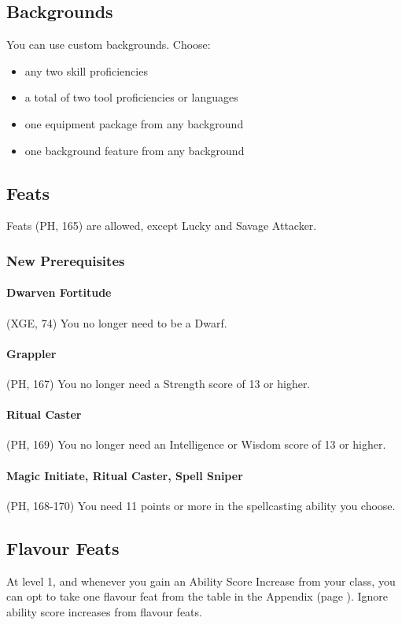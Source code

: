 \documentclass[letterpaper,twocolumn,openany,nodeprecatedcode,bg=print]{dndbook}
\newcommand{\pg}[1]{page \pageref{#1}}
\begin{document}
\subsection{Backgrounds}
You can use custom backgrounds. Choose:
\begin{itemize}
\item any two skill proficiencies 
\item a total of two tool proficiencies or languages 
\item one equipment package from any background
\item one background feature from any background
\end{itemize}

\subsection{Feats}
Feats (PH, 165) are allowed, except Lucky and Savage Attacker.

\subsubsection{New Prerequisites}

\paragraph{Dwarven Fortitude} (XGE, 74) 
You no longer need to be a Dwarf.

\paragraph{Grappler} (PH, 167) 
You no longer need a Strength score of 13 or higher.

\paragraph{Ritual Caster} (PH, 169) 
You no longer need an Intelligence or Wisdom score of 13 or higher.

\paragraph{Magic Initiate, Ritual Caster, Spell Sniper} (PH, 168-170) 
You need 11 points or more in the spellcasting ability you choose.

\subsection{Flavour Feats}
\label{flavour-feats}
At level 1, and whenever you gain an Ability Score Increase from your class, 
you can opt to take one flavour feat from the table in the Appendix (\pg{flavour-feats-table}). 
Ignore ability score increases from flavour feats.
\end{document}
